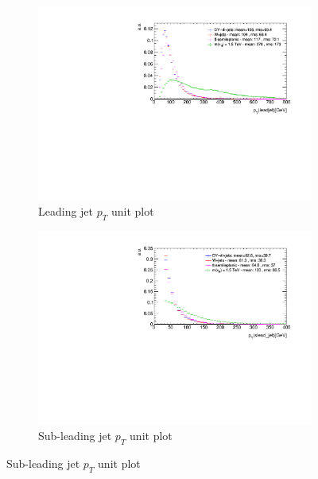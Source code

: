 \begin{figure}       
        \centering
        \begin{subfigure}[b]{0.475\textwidth}
            \centering
            \includegraphics[width=\textwidth]{Figures/Plots/ljet_pt_unitNC}
            \caption[]%
            {{\small Leading jet $p_{T}$ unit plot}}    
        \end{subfigure}
        \hfill
        \begin{subfigure}[b]{0.475\textwidth}  
            \centering 
            \includegraphics[width=\textwidth]{Figures/Plots/sjet_pt_unitNC}
            \caption[]%
            {{\small Sub-leading jet $p_{T}$ unit plot}}    
        \end{subfigure}

\end{figure}
